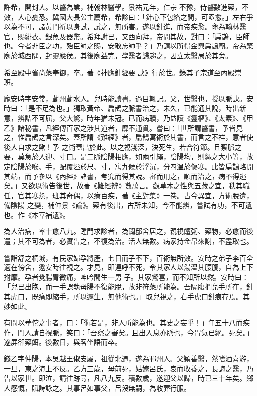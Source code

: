 \begin{pinyinscope}
 許希，開封人。以醫為業，補翰林醫學。景祐元年，仁宗
 不豫，侍醫數進藥，不效，人心憂恐。冀國大長公主薦希，希診曰：「針心下包絡之間，可亟愈。」左右爭以為不可，諸黃門祈以身試，試之，無所害。遂以針進，而帝疾愈。命為翰林醫官，賜緋衣、銀魚及器幣。希拜謝已，又西向拜，帝問其故，對曰：「扁鵲，臣師也。今者非臣之功，殆臣師之賜，安敢忘師乎？」乃請以所得金興扁鵲廟。帝為築廟於城西隅，封靈應侯。其後廟益完，學醫者歸趨之，因立太醫局於其旁。



 希至殿中省尚藥奉御，卒。著《神應針經要
 訣》行於世。錄其子宗道至內殿崇班。



 龐安時字安常，蘄州蘄水人。兒時能讀書，過目輒記。父，世醫也，授以脈訣。安時曰：「是不足為也。」獨取黃帝、扁鵲之脈書治之，未久，已能通其說，時出新意，辨詰不可屈，父大驚，時年猶未冠。已而病聵，乃益讀《靈樞》、《太素》、《甲乙》諸秘書，凡經傳百家之涉其道者，靡不通貫。嘗曰：「世所謂醫書，予皆見之，惟扁鵲之言深矣。蓋所謂《難經》者，扁鵲寓術於其書，而言之不祥，意者使後人自求之歟！予
 之術蓋出於此。以之視淺深，決死生，若合符節。且察脈之要，莫急於人迎、寸口。是二脈陰陽相應，如兩引繩，陰陽均，則繩之大小等，故定陰陽於喉、手，配覆溢於尺、寸，寓九候於浮沉，分四溫於傷寒。此皆扁鵲略開其端，而予參以《內經》諸書，考究而得其說。審而用之，順而治之，病不得逃矣。」又欲以術告後世，故著《難經辨》數萬言。觀草木之性與五藏之宜，秩其職任，官其寒熱，班其奇偶，以療百疾，著《主對集》一卷。古今異宜，方術脫遺，備陰陽
 之變，補仲景《論》。藥有後出，古所未知，今不能辨，嘗試有功，不可遺也。作《本草補遺》。



 為人治病，率十愈八九。踵門求診者，為闢邸舍居之，親視饘粥、藥物，必愈而後遣；其不可為者，必實告之，不復為治。活人無數。病家持金帛來謝，不盡取也。



 嘗詣舒之桐城，有民家婦孕將產，七日而子不下，百術無所效。安時之弟子李百全適在傍舍，邀安時往視之。才見，即連呼不死，令其家人以湯溫其腰腹，自為上下拊摩。孕者覺腸胃微痛，呻吟間生一男
 子。其家驚喜，而不知所以然。安時曰：「兒已出胞，而一手誤執母腸不復能脫，故非符藥所能為。吾隔腹捫兒手所在，針其虎口，既痛即縮手，所以遽生，無他術也。」取兒視之，右手虎口針痕存焉。其妙如此。



 有問以華佗之事者，曰：「術若是，非人所能為也。其史之妄乎！」年五十八而疾作，門人請自視脈，笑曰：「吾察之審矣。且出入息亦脈也，今胃氣已絕。死矣。」遂屏卻藥餌。後數日，與客坐語而卒。



 錢乙字仲陽，本吳越王俶支屬，祖從北遷，遂為鄆州人。父穎善醫，然嗜酒喜游，一旦，東之海上不反。乙方三歲，母前死，姑嫁呂氏，哀而收養之，長誨之醫，乃告以家世。即泣，請往跡尋，凡八九反。積數歲，遂迎父以歸，時已三十年矣。鄉人感慨，賦詩詠之。其事呂如事父，呂沒無嗣，為收葬行服。




\end{pinyinscope}
